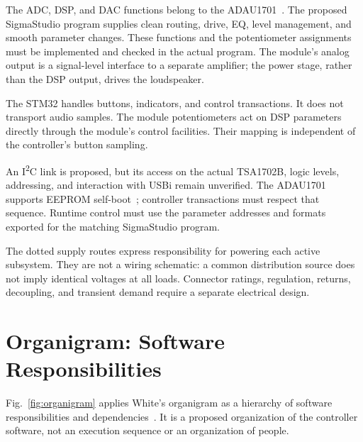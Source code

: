 \documentclass[conference]{IEEEtran}
\begin{document}
The ADC, DSP, and DAC functions belong to the ADAU1701~\cite{adau}.
The proposed SigmaStudio program supplies clean routing, drive, EQ, level
management, and smooth parameter changes. These functions and the
potentiometer assignments must be implemented and checked in the actual
program. The module's analog output is a signal-level interface to a
separate amplifier; the power stage, rather than the DSP output, drives
the loudspeaker.

The STM32 handles buttons, indicators, and control transactions. It does
not transport audio samples. The module potentiometers act on DSP
parameters directly through the module's control facilities. Their mapping
is independent of the controller's button sampling.

An I\textsuperscript{2}C link is proposed, but its access on the actual
TSA1702B, logic levels, addressing, and interaction with USBi remain
unverified. The ADAU1701 supports EEPROM self-boot~\cite{adau}; controller
transactions must respect that sequence. Runtime control must use the
parameter addresses and formats exported for the matching SigmaStudio
program.

The dotted supply routes express responsibility for powering each active
subsystem. They are not a wiring schematic: a common distribution source
does not imply identical voltages at all loads. Connector ratings,
regulation, returns, decoupling, and transient demand require a separate
electrical design.

\section{Organigram: Software Responsibilities}

Fig.~\ref{fig:organigram} applies White's organigram as a hierarchy of
software responsibilities and dependencies~\cite{white}. It is a proposed
organization of the controller software, not an execution sequence or an
organization of people.
\end{document}
